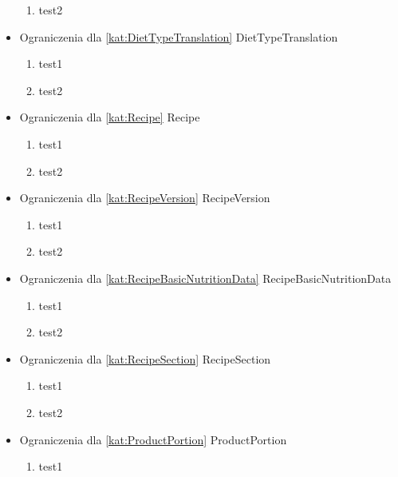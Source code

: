 \begin{itemize}[label={}]
\begin{enumerate}[label={\textbf{OGR/\protect\threedigits{\arabic{enumi}}}}, wide, labelwidth=!, resume]
        \item test2
    \end{enumerate}
    \item Ograniczenia dla \ref{kat:DietTypeTranslation} DietTypeTranslation
    \begin{enumerate}[label={\textbf{OGR/\protect\threedigits{\arabic{enumi}}}}, wide, labelwidth=!, resume]
        \item test1
        \item test2
    \end{enumerate}
    \item Ograniczenia dla \ref{kat:Recipe} Recipe
    \begin{enumerate}[label={\textbf{OGR/\protect\threedigits{\arabic{enumi}}}}, wide, labelwidth=!, resume]
        \item test1
        \item test2
    \end{enumerate}
    \item Ograniczenia dla \ref{kat:RecipeVersion} RecipeVersion
    \begin{enumerate}[label={\textbf{OGR/\protect\threedigits{\arabic{enumi}}}}, wide, labelwidth=!, resume]
        \item test1
        \item test2
    \end{enumerate}
    \item Ograniczenia dla \ref{kat:RecipeBasicNutritionData} RecipeBasicNutritionData
    \begin{enumerate}[label={\textbf{OGR/\protect\threedigits{\arabic{enumi}}}}, wide, labelwidth=!, resume]
        \item test1
        \item test2
    \end{enumerate}
    \item Ograniczenia dla \ref{kat:RecipeSection} RecipeSection
    \begin{enumerate}[label={\textbf{OGR/\protect\threedigits{\arabic{enumi}}}}, wide, labelwidth=!, resume]
        \item test1
        \item test2
    \end{enumerate}
    \item Ograniczenia dla \ref{kat:ProductPortion} ProductPortion
    \begin{enumerate}[label={\textbf{OGR/\protect\threedigits{\arabic{enumi}}}}, wide, labelwidth=!, resume]
        \item test1

\end{enumerate}
\end{itemize}
